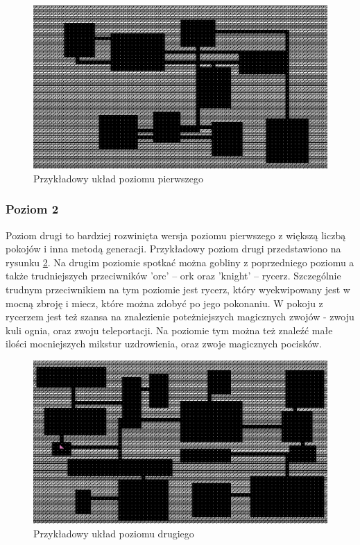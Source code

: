 \documentclass[12pt,twoside]{article}
\begin{document}
\FloatBarrier
\begin{figure}[h]
	\centering
	\includegraphics[width=12cm]{images/mygame/map1.png}
	\caption{Przykładowy układ poziomu pierwszego}
	\label{mygame:map1}
\end{figure}
\FloatBarrier


\subsubsection{Poziom 2}
Poziom drugi to bardziej rozwinięta wersja poziomu pierwszego z większą liczbą pokojów i inna metodą generacji. Przykładowy poziom drugi przedstawiono na rysunku \ref{mygame:map2}. Na drugim poziomie spotkać można gobliny z poprzedniego poziomu a także trudniejszych przeciwników 'orc' -- ork oraz 'knight' -- rycerz. Szczególnie trudnym przeciwnikiem na tym poziomie jest rycerz, który wyekwipowany jest w mocną zbroję i miecz, które można zdobyć po jego pokonaniu. W pokoju z rycerzem jest też szansa na znalezienie poteżniejszych magicznych zwojów - zwoju kuli ognia, oraz zwoju teleportacji. Na poziomie tym można też znaleźć małe ilości mocniejszych mikstur uzdrowienia, oraz zwoje magicznych pocisków.


\FloatBarrier
\begin{figure}[h]
	\centering
	\includegraphics[width=12cm]{images/mygame/map2.png}
	\caption{Przykładowy układ poziomu drugiego}
	\label{mygame:map2}
\end{figure}
\FloatBarrier
\end{document}
